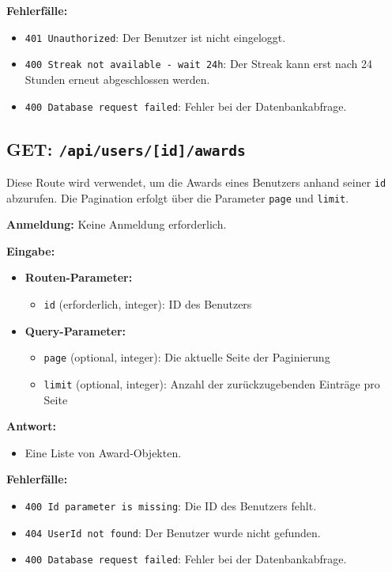 \documentclass[a4paper,12pt]{article}
\begin{document}
\textbf{Fehlerfälle:}
\begin{itemize}
    \item \texttt{401 Unauthorized}:
        Der Benutzer ist nicht eingeloggt.
    \item \texttt{400 Streak not available - wait 24h}:
        Der Streak kann erst nach 24 Stunden erneut abgeschlossen werden.
    \item \texttt{400 Database request failed}:
        Fehler bei der Datenbankabfrage.
\end{itemize}

\newpage
\subsection{GET: \texttt{/api/users/[id]/awards}}

Diese Route wird verwendet, um die Awards eines Benutzers anhand seiner
\texttt{id} abzurufen. Die Pagination erfolgt über die Parameter \texttt{page}
und \texttt{limit}.

\textbf{Anmeldung:} Keine Anmeldung erforderlich.

\textbf{Eingabe:}
\begin{itemize}
    \item \textbf{Routen-Parameter:}
    \begin{itemize}
        \item \texttt{id} (erforderlich, integer):
            ID des Benutzers
    \end{itemize}
    \item \textbf{Query-Parameter:}
    \begin{itemize}
        \item \texttt{page} (optional, integer):
            Die aktuelle Seite der Paginierung
        \item \texttt{limit} (optional, integer):
            Anzahl der zurückzugebenden Einträge pro Seite
    \end{itemize}
\end{itemize}

\textbf{Antwort:}
\begin{itemize}
    \item Eine Liste von Award-Objekten.
\end{itemize}

\textbf{Fehlerfälle:}
\begin{itemize}
    \item \texttt{400 Id parameter is missing}:
        Die ID des Benutzers fehlt.
    \item \texttt{404 UserId not found}:
        Der Benutzer wurde nicht gefunden.
    \item \texttt{400 Database request failed}:
        Fehler bei der Datenbankabfrage.
\end{itemize}
\end{document}
